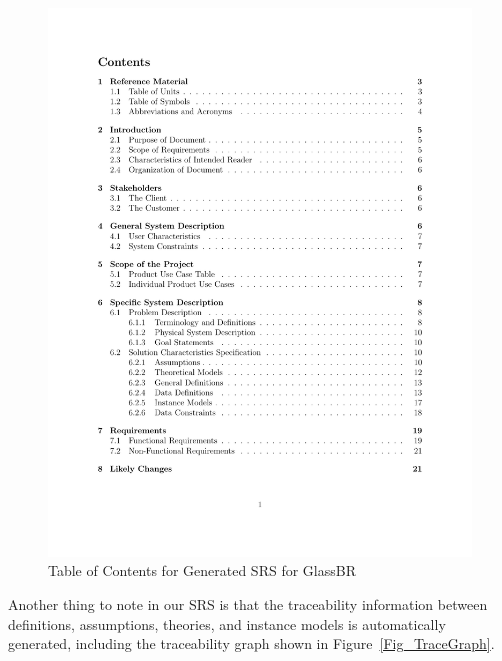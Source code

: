 \documentclass[sigconf]{acmart}
\begin{document}
\begin{figure}
\begin{center}
\includegraphics[scale=0.5]{./figures/TofC.pdf}
\end{center}
\caption{Table of Contents for Generated SRS for GlassBR}
\label{Fig_ToCGlassBRSRS}
\end{figure}

Another thing to note in our SRS is that the traceability information between
definitions, assumptions, theories, and instance models is automatically 
generated, including the traceability graph shown in 
Figure~\ref{Fig_TraceGraph}.
\end{document}
